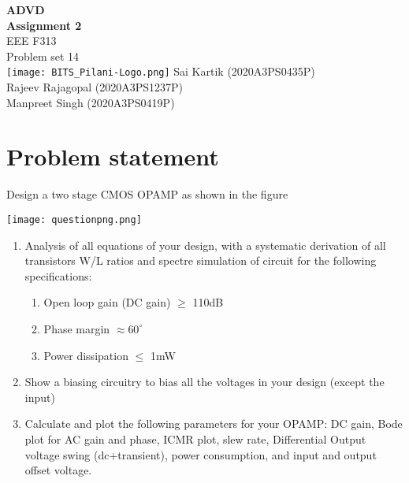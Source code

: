 \documentclass[titlepage]{article}
\begin{document}
\begin{titlepage}
    \begin{center}
        \Huge
        \vspace*{3cm}
        \textbf{  ADVD \\  \quad Assignment 2} \\
        \quad EEE F313\\[3ex]
        \huge
        \quad Problem set 14 \\[2ex]
        \quad\texttt{[image: BITS\_Pilani-Logo.png]}
        \vfill
        \huge
        \quad Sai Kartik (2020A3PS0435P)\\\quad Rajeev Rajagopal (2020A3PS1237P) \\ \quad Manpreet Singh (2020A3PS0419P)
    \end{center}
\end{titlepage}



\tableofcontents
\listoffigures
\listoftables
\newpage
{}
\setcounter{page}{1}

\section {Problem statement}
\begin{tcolorbox}
    Design a two stage CMOS OPAMP as shown in the figure
    \begin{center}
        \texttt{[image: questionpng.png]}
    \end{center}
    \begin{enumerate}[label=(\alph*)]
        \item Analysis of all equations of your design, with a systematic derivation of all transistors W/L ratios and spectre simulation of circuit for the following specifications:
              \begin{enumerate}[label=(\roman*)]
                  \item Open loop gain (DC gain) $\geq$ 110dB
                  \item Phase margin $\approx 60^{\circ}$
                  \item Power dissipation $\leq$ 1mW
              \end{enumerate}
        \item Show a biasing circuitry to bias all the voltages in your design (except the input)
        \item Calculate and plot the following parameters for your OPAMP: DC gain, Bode plot for AC gain and phase, ICMR plot, slew rate, Differential Output voltage swing (dc+transient), power consumption, and input and output offset voltage.
    \end{enumerate}
\end{tcolorbox}
\newpage
\end{document}
